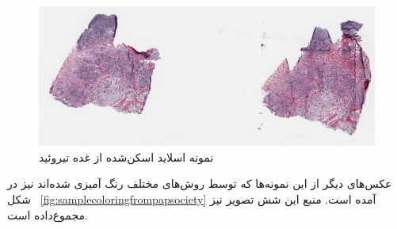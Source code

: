 \begin{figure}
    \begin{center}
        \includegraphics[width=\linewidth]{figs/basic_concepts/subs/Sample Slide From NCI.PNG}
    \end{center}
    \caption{نمونه اسلاید اسکن‌شده از غده تیروئید}
    \label{fig:sampleWSIscan}
\end{figure}
عکس‌های دیگر از این نمونه‌ها که توسط روش‌های مختلف رنگ آمیزی شده‌اند نیز در شکل ~\autoref{fig:samplecoloringfrompapsociety} آمده است.
منبع این شش تصویر نیز مجموع‌داده \cite{papsocietyiamgeatlas} است.
